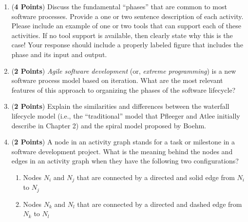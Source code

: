 \documentclass[12pt,epsf,psfig,graphics]{article}
\begin{document}
\begin{enumerate}
        \begin{enumerate}
          
        \item ({\bf 4 Points}) Discuss the fundamental ``phases'' that
          are common to most software processes.  Provide a one or two
          sentence description of each activity.  Please include an
          example of one or two tools that can support each of these
          activities. If no tool support is available, then clearly
          state why this is the case!  Your response should include a
          properly labeled figure that includes the phase and its
          input and output.
          

        \item ({\bf 2 Points}) {\em Agile software development} (or,
          {\em extreme programming}) is a new software process model
          based on iteration.  What are the most relevant features of
          this approach to organizing the phases of the software
          lifecycle?

        \item ({\bf 2 Points}) Explain the similarities and
          differences between the waterfall lifecycle model (i.e., the
          ``traditional'' model that Pfleeger and Atlee initially
          describe in Chapter 2) and the spiral model proposed by
          Boehm.

        \item ({\bf 2 Points}) A node in an activity graph stands for
          a task or milestone in a software development project.  What
          is the meaning behind the nodes and edges in an activity
          graph when they have the following two configurations?

          \begin{enumerate}

            \item Nodes $N_i$ and $N_j$ that are connected by a
              directed and solid edge from $N_i$ to $N_j$

            \item Nodes $N_k$ and $N_l$ that are connected by a
              directed and dashed edge from $N_k$ to $N_l$


\end{enumerate}
\end{enumerate}
\end{enumerate}
\end{document}

